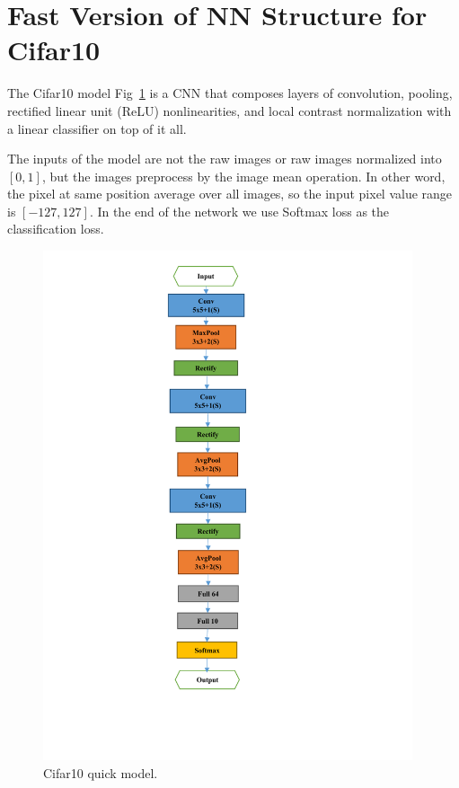\documentclass[12pt]{article}
\begin{document}
\section{Fast Version of NN Structure for Cifar10}
The Cifar10 model Fig~\ref{fig:quick_model} is a CNN that composes layers of convolution, pooling, rectified linear unit (ReLU) nonlinearities, and local contrast normalization with a linear classifier on top of it all.

The inputs of the model are not the raw images or raw images normalized into $[0,1]$, but the images preprocess by the image mean operation. In other word, the pixel at same position average over all images, so the input pixel value range is $[-127,127]$. In the end of the network we use Softmax loss as the classification loss. 

\begin{figure}[!ht]
    \centering
    \includegraphics[height=15cm]{3.pdf}
    \caption{\label{fig:quick_model} Cifar10 quick model. }
\end{figure}
\end{document}

